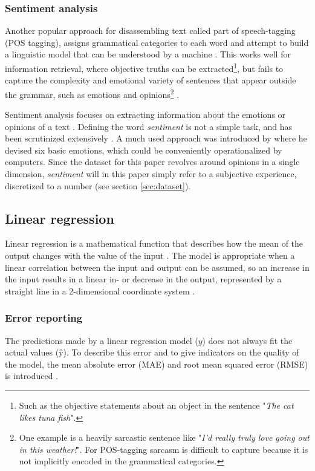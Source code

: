 \documentclass[a4paper]{article}
\begin{document}
\subsubsection{Sentiment analysis}
Another popular approach for disassembling text
called part of speech-tagging (POS tagging), assigns grammatical categories
to each word and attempt to build a linguistic model that can be understood by
a machine \citep{Jurafsky2000}. This works well for information retrieval,
where objective truths can be extracted\footnote{Such as the objective statements about an object in the
sentence "\textit{The cat likes tuna fish}".}, but fails
to capture the complexity and emotional variety of sentences that appear
outside the grammar, such as emotions and opinions\footnote{One example is a heavily sarcastic sentence like
"\textit{I'd really truly love going out in this weather!}". For POS-tagging
sarcasm is difficult to capture because it is not implicitly encoded in the
grammatical categories.} \citep{Jurafsky2000}.
\label{text:irony}

Sentiment analysis focuses on extracting information about the emotions or
opinions of a text \citep{PangLee2008}.
Defining the word \textit{sentiment} is not a simple task, and has been
scrutinized extensively \citep{Jurafsky2000, PangLee2008}.
A much used approach was introduced by \cite{Ekman92} where he devised six
basic emotions, which could be conveniently operationalized by computers.
Since the dataset for this paper revolves around opinions in a single dimension,
\textit{sentiment} will in this paper simply refer to a subjective experience,
discretized to a number (see section \ref{sec:dataset}).

\subsection{Linear regression}
Linear regression is a mathematical function that describes how the mean of the
output changes with the value of the input \citep{Agresti2008}. The model is
appropriate when a linear correlation between the input and output can be
assumed, so an increase in the input results in a linear in- or decrease in
the output, represented by a straight line in a 2-dimensional coordinate system
\citep{Agresti2008}.

\subsubsection{Error reporting}
The predictions made by a linear regression model ($y$) does not always fit
the actual values ($ŷ$). To describe this error and to give indicators on the
quality of the model, the mean absolute error (MAE) and root mean squared
error (RMSE) is introduced \citep{Agresti2008, Chai2014}.
\end{document}
